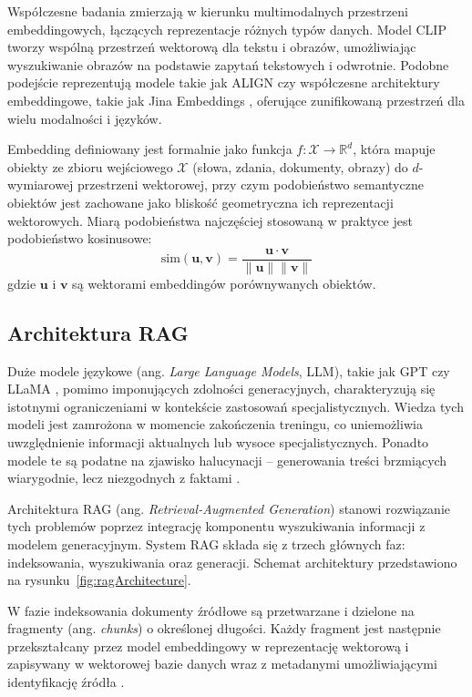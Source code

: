 Współczesne badania zmierzają w kierunku multimodalnych przestrzeni embeddingowych, łączących reprezentacje różnych typów danych. Model CLIP \cite{radford2021learning} tworzy wspólną przestrzeń wektorową dla tekstu i obrazów, umożliwiając wyszukiwanie obrazów na podstawie zapytań tekstowych i odwrotnie. Podobne podejście reprezentują modele takie jak ALIGN \cite{jia2021scaling} czy współczesne architektury embeddingowe, takie jak Jina Embeddings \cite{gunther2023jina}, oferujące zunifikowaną przestrzeń dla wielu modalności i języków.

Embedding definiowany jest formalnie jako funkcja $f: \mathcal{X} \rightarrow \mathbb{R}^d$, która mapuje obiekty ze zbioru wejściowego $\mathcal{X}$ (słowa, zdania, dokumenty, obrazy) do $d$-wymiarowej przestrzeni wektorowej, przy czym podobieństwo semantyczne obiektów jest zachowane jako bliskość geometryczna ich reprezentacji wektorowych. Miarą podobieństwa najczęściej stosowaną w praktyce jest podobieństwo kosinusowe:
\begin{equation}
    \text{sim}(\mathbf{u}, \mathbf{v}) = \frac{\mathbf{u} \cdot \mathbf{v}}{\|\mathbf{u}\| \|\mathbf{v}\|}
\end{equation}
gdzie $\mathbf{u}$ i $\mathbf{v}$ są wektorami embeddingów porównywanych obiektów.

\subsection{Architektura RAG}

Duże modele językowe (ang. \textit{Large Language Models}, LLM), takie jak GPT \cite{brown2020language} czy LLaMA \cite{touvron2023llama}, pomimo imponujących zdolności generacyjnych, charakteryzują się istotnymi ograniczeniami w kontekście zastosowań specjalistycznych. Wiedza tych modeli jest zamrożona w momencie zakończenia treningu, co uniemożliwia uwzględnienie informacji aktualnych lub wysoce specjalistycznych. Ponadto modele te są podatne na zjawisko halucynacji -- generowania treści brzmiących wiarygodnie, lecz niezgodnych z faktami \cite{ji2023survey}.

Architektura RAG (ang. \textit{Retrieval-Augmented Generation}) \cite{lewis2020retrieval} stanowi rozwiązanie tych problemów poprzez integrację komponentu wyszukiwania informacji z modelem generacyjnym. System RAG składa się z trzech głównych faz: indeksowania, wyszukiwania oraz generacji. Schemat architektury przedstawiono na rysunku~\ref{fig:ragArchitecture}.

W fazie indeksowania dokumenty źródłowe są przetwarzane i dzielone na fragmenty (ang. \textit{chunks}) o określonej długości. Każdy fragment jest następnie przekształcany przez model embeddingowy w reprezentację wektorową i zapisywany w wektorowej bazie danych wraz z metadanymi umożliwiającymi identyfikację źródła \cite{johnson2019billion}.

